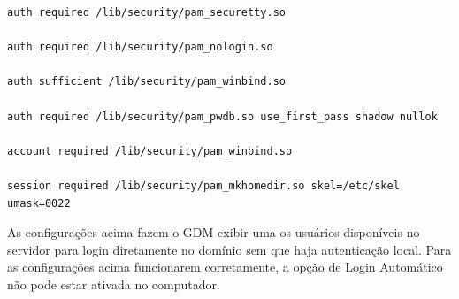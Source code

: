 \begin{lstlisting}	
auth required /lib/security/pam_securetty.so

auth required /lib/security/pam_nologin.so

auth sufficient /lib/security/pam_winbind.so

auth required /lib/security/pam_pwdb.so use_first_pass shadow nullok

account required /lib/security/pam_winbind.so

session required /lib/security/pam_mkhomedir.so skel=/etc/skel umask=0022
\end{lstlisting}

As configurações acima fazem o GDM exibir uma os usuários disponíveis no servidor para login diretamente no domínio sem que haja autenticação local. Para as configurações acima funcionarem corretamente, a opção de Login Automático não pode estar ativada no computador.